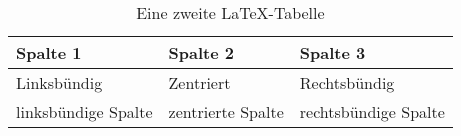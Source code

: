 
\begin{table}[h!]
\begin{center}
\begin{tabular}{p{4.5cm}|C{3.5cm}|R{4.5cm}}
Spalte 1              &   Spalte 2            &   Spalte 3                \\ 
\hline
Linksbündig           &   Zentriert           &   Rechtsbündig            \\  
\hline
linksbündige Spalte   &   zentrierte Spalte   &   rechtsbündige Spalte    \\ 
\end{tabular}
\caption{Eine zweite LaTeX-Tabelle}
\end{center}
\end{table}

